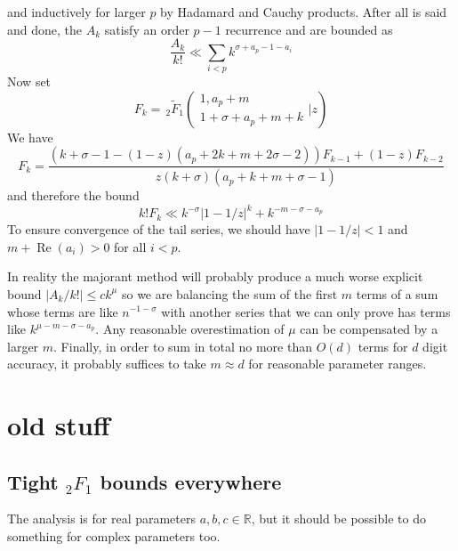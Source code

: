 \documentclass[10pt]{article}
\begin{document}
and inductively for larger $p$ by Hadamard and Cauchy products. After all is said and done, the $A_k$ satisfy an order $p-1$ recurrence and are bounded as
\begin{equation}
\frac{A_k}{k!} \ll \sum_{i<p}k^{\sigma+a_p-1-a_i}
\end{equation}
Now set
\begin{equation*}
F_k = \, _2\tilde{F}_1\left( \begin{array}{c} 1,a_p+m \\ 1+\sigma+a_p+m+k \end{array} \Big| z\right)
\end{equation*}
We have
\begin{equation*}
F_k=\frac{\left(k+\sigma -1 - (1-z) \left(a_p+2 k+m+2 \sigma
   -2\right)\right) F_{k-1} +(1-z) F_{k-2}}{z (k+\sigma )
   \left(a_p+k+m+\sigma -1\right)}
\end{equation*}
and therefore the bound
\begin{equation*}
k!F_k \ll k^{-\sigma} \left|1-1/z\right|^k + k^{-m-\sigma-a_p}
\end{equation*}
To ensure convergence of the tail series, we should have
$|1-1/z|<1$ and $m+\operatorname{Re}(a_i)>0$ for all $i<p$.

In reality the majorant method will probably produce a much worse explicit bound $|A_k/k!| \le c k^{\mu}$ so we are balancing the sum of the first $m$ terms of a sum whose terms are like $n^{-1-\sigma}$ with another series that we can only prove has terms like $k^{\mu-m-\sigma-a_p}$. Any reasonable overestimation of $\mu$ can be compensated by a larger $m$. Finally, in order to sum in total no more than $O(d)$ terms for $d$ digit accuracy, it probably suffices to take $m \approx d$ for reasonable parameter ranges.

\section{old stuff}
\subsection{Tight ${}_2 F_1$ bounds everywhere}
The analysis is for real parameters $a,b,c \in \mathbb{R}$, but it should be possible to do something for complex parameters too.
\end{document}
